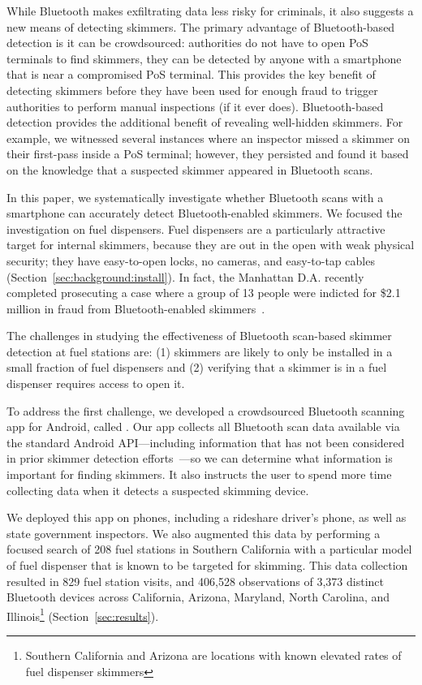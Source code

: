 While Bluetooth makes exfiltrating data less risky for criminals, it also
suggests a new means of detecting skimmers.
%
The primary advantage of Bluetooth-based detection is it can be crowdsourced:
authorities do not have to open PoS terminals to find skimmers, they can be
detected by anyone with a smartphone that is near a compromised PoS terminal.
%
This provides the key benefit of detecting skimmers before they have been used
for enough fraud to trigger authorities to perform manual inspections (if it
ever does).
%
Bluetooth-based detection provides the additional benefit of revealing
well-hidden skimmers.
%
For example, we witnessed several instances where an inspector missed a skimmer
on their first-pass inside a PoS terminal; however, they persisted and found it based on
the knowledge that a suspected skimmer appeared in Bluetooth scans.

In this paper, we systematically investigate whether Bluetooth scans with a
smartphone can accurately detect Bluetooth-enabled skimmers.
%
We focused the investigation on fuel dispensers.
%
Fuel dispensers are a particularly attractive target for internal skimmers,
because they are out in the open with weak physical security; they have
easy-to-open locks, no cameras, and easy-to-tap cables
(Section~\ref{sec:background:install}).
%
In fact, the Manhattan D.A. recently completed prosecuting a case where a group
of 13 people were indicted for \$2.1 million in fraud from Bluetooth-enabled
skimmers~\cite{da-manhattan-skimmers}.
 
The challenges in studying the effectiveness of Bluetooth scan-based skimmer
detection at fuel stations are: (1) skimmers are likely to only be installed in
a small fraction of fuel dispensers
%
and (2) verifying that a skimmer is in a fuel dispenser requires access to open
it.
 
To address the first challenge, we developed a crowdsourced Bluetooth scanning
app for Android, called \bluetana.
%
Our app collects all Bluetooth scan data available via the standard Android
API---including information that has not been considered in prior skimmer
detection efforts~\cite{sparkfunapp,skimplus,ag-mn-skimmers}---so we can
determine what information is important for finding skimmers.
%
It also instructs the user to spend more time collecting data when it detects a
suspected skimming device.
 
We deployed this app on  phones, including a rideshare driver's phone,
as well as state government inspectors.
%
We also augmented this data by performing a focused search of 208 fuel stations
in Southern California with a particular model of fuel dispenser that is known
to be targeted for skimming.
%
This data collection resulted in 829 fuel station visits, and 406,528
observations of 3,373 distinct Bluetooth devices across California, Arizona,
Maryland, North Carolina, and Illinois\footnote{Southern California and Arizona
are locations with known elevated rates of fuel dispenser skimmers}
(Section~\ref{sec:results}).

